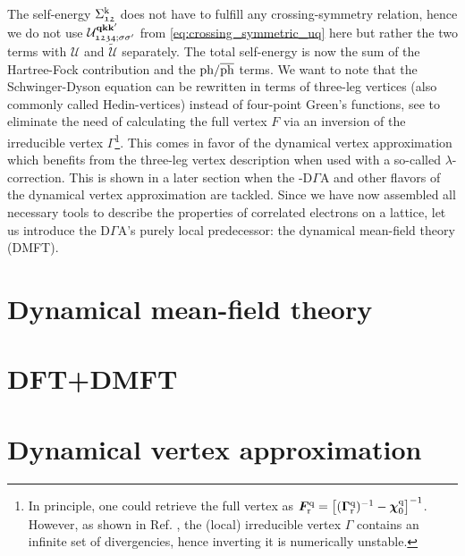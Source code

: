 \documentclass[../../main.tex]{subfiles}
\begin{document}
The self-energy $\Sigma^{\text{k}}_{\mathfrak{12}}$ does not have to fulfill any crossing-symmetry relation, hence we do not use $\mathcal{U}^{\textbf{qkk}'}_{\mathfrak{1234};\sigma\sigma'}$ from \eqref{eq:crossing_symmetric_uq} here but rather the two terms with $\mathcal{U}$ and $\tilde{\mathcal{U}}$ separately. The total self-energy is now the sum of the Hartree-Fock contribution and the $\text{ph}/\overline{\text{ph}}$ terms. We want to note that the Schwinger-Dyson equation can be rewritten in terms of three-leg vertices (also commonly called Hedin-vertices) instead of four-point Green's functions, see \cite{hedin, krien boson exchange} to eliminate the need of calculating the full vertex $F$ via an inversion of the irreducible vertex $\Gamma$\footnote{In principle, one could retrieve the full vertex as $\bm F_{\text{r}}^{\text{q}}=\left [(\bm\Gamma_{\text{r}}^{\text{q}})^{-1}-\bm\chi_{0}^{\text{q}}\right ]^{-1}$. However, as shown in Ref. \cite{schäfer nonperturbative}, the (local) irreducible vertex $\Gamma$ contains an infinite set of divergencies, hence inverting it is numerically unstable.}. This comes in favor of the dynamical vertex approximation which benefits from the three-leg vertex description when used with a so-called $\lambda$-correction. This is shown in a later section when the -D$\Gamma$A and other flavors of the dynamical vertex approximation are tackled. Since we have now assembled all necessary tools to describe the properties of correlated electrons on a lattice, let us introduce the D$\Gamma$A's purely local predecessor: the dynamical mean-field theory (DMFT).

\section{Dynamical mean-field theory}

\section{DFT+DMFT}

\section{Dynamical vertex approximation}
\end{document}

